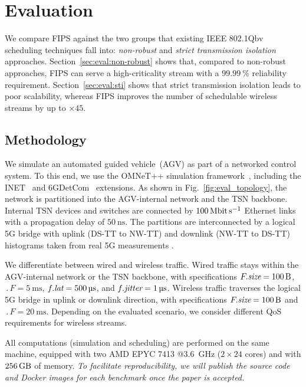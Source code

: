 \section{Evaluation} \label{sec:eval}
We compare FIPS against the two groups that existing IEEE 802.1Qbv scheduling techniques fall into: \textit{non-robust} and \textit{strict transmission isolation} approaches.
Section~\ref{sec:eval:non-robust} shows that, compared to non-robust approaches, FIPS can serve a high-criticality stream with a $\qty{99.99}{\percent}$ reliability requirement.
Section~\ref{sec:eval:sti} shows that strict transmission isolation leads to poor scalability, whereas FIPS improves the number of schedulable wireless streams by up to $\times 45$.



\subsection{Methodology}
We simulate an automated guided vehicle~(AGV) as part of a networked control system.
To this end, we use the OMNeT++ simulation framework~\cite{Varga2010}, including the INET~\cite{Mros2019} and 6GDetCom~\cite{lucas_2023_10401977} extensions.
As shown in Fig.~\ref{fig:eval_topology}, the network is partitioned into the AGV-internal network and the TSN backbone.
Internal TSN devices and switches are connected by $\qty{100}{\mega\bit\per\s}$ Ethernet links with a propagation delay of $\qty{50}{\ns}$. 
The partitions are interconnected by a logical 5G bridge with uplink (DS-TT to NW-TT) and downlink (NW-TT to DS-TT) histograms taken from real 5G measurements \cite{downlink_example_histogram}.

We differentiate between wired and wireless traffic. 
Wired traffic stays within the AGV-internal network or the TSN backbone, with specifications $\size{F} = \qty{100}{\byte}$, $\period{F} = \qty{5}{\ms}$, $\ete{f} = \qty{500}{\us}$, and $\jitter{f} = \qty{1}{\us}$.
Wireless traffic traverses the logical 5G bridge in uplink or downlink direction, with specifications $\size{F} = \qty{100}{\byte}$ and $\period{F} = \qty{20}{\ms}$.
Depending on the evaluated scenario, we consider different QoS requirements for wireless streams.

All computations (simulation and scheduling) are performed on the same machine, equipped with two AMD EPYC 7413 @\qty{3.6}{\giga\hertz} ($2\times24$ cores) and with $\qty{256}{\giga\byte}$ of memory.
\textit{To facilitate reproducibility, we will publish the source code and Docker images for each benchmark once the paper is accepted.}

